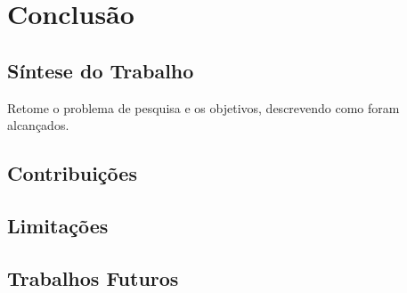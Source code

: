 
\chapter{Conclusão}
\label{cap:conclusao}

\section{Síntese do Trabalho}

Retome o problema de pesquisa e os objetivos, descrevendo como
foram alcançados.

\section{Contribuições}

\section{Limitações}

\section{Trabalhos Futuros}
